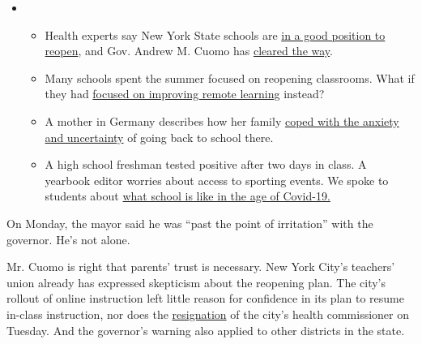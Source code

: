 \begin{itemize}
\item
  \begin{itemize}
  \tightlist
  \item
    Health experts say New York State schools are
    \href{https://www.nytimes.com/2020/08/07/health/coronavirus-ny-schools-reopen.html?action=click\&pgtype=Article\&state=default\&region=MAIN_CONTENT_2\&context=storylines_keepup}{in
    a good position to reopen}, and Gov. Andrew M. Cuomo has
    \href{https://www.nytimes.com/2020/08/07/nyregion/cuomo-schools-reopening.html?action=click\&pgtype=Article\&state=default\&region=MAIN_CONTENT_2\&context=storylines_keepup}{cleared
    the way}.
  \item
    Many schools spent the summer focused on reopening classrooms. What
    if they had
    \href{https://www.nytimes.com/2020/08/07/us/remote-learning-fall-2020.html?action=click\&pgtype=Article\&state=default\&region=MAIN_CONTENT_2\&context=storylines_keepup}{focused
    on improving remote learning} instead?
  \item
    A mother in Germany describes how her family
    \href{https://www.nytimes.com/2020/08/07/parenting/germany-schools-reopening-children.html?action=click\&pgtype=Article\&state=default\&region=MAIN_CONTENT_2\&context=storylines_keepup}{coped
    with the anxiety and uncertainty} of going back to school there.
  \item
    A high school freshman tested positive after two days in class. A
    yearbook editor worries about access to sporting events. We spoke to
    students about
    \href{https://www.nytimes.com/2020/08/06/us/coronavirus-students.html?action=click\&pgtype=Article\&state=default\&region=MAIN_CONTENT_2\&context=storylines_keepup}{what
    school is like in the age of Covid-19.}
  \end{itemize}
\end{itemize}

On Monday, the mayor said he was ``past the point of irritation'' with
the governor. He's not alone.

Mr. Cuomo is right that parents' trust is necessary. New York City's
teachers' union already has expressed skepticism about the reopening
plan. The city's rollout of online instruction left little reason for
confidence in its plan to resume in-class instruction, nor does the
\href{https://www.nytimes.com/2020/08/04/nyregion/oxiris-barbot-health-commissioner-resigns.html?referringSource=articleShare}{resignation}
of the city's health commissioner on Tuesday. And the governor's warning
also applied to other districts in the state.

